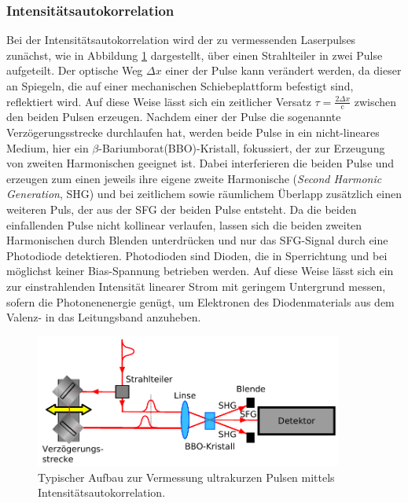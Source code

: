       \subsubsection{Intensitätsautokorrelation}  
      \label{sec:AK47}
        Bei der Intensitätsautokorrelation wird der zu vermessenden Laserpulses zunächst, wie in Abbildung \ref{fig:autokorrelator} dargestellt, über einen Strahlteiler in zwei Pulse aufgeteilt. 
        Der optische Weg $\Delta x$ einer der Pulse kann verändert werden, da dieser an Spiegeln, die auf einer mechanischen Schiebeplattform befestigt sind, reflektiert wird. Auf diese Weise lässt sich 
        ein zeitlicher Versatz $\tau=\frac{2\Delta x}{\text{c}}$ zwischen den beiden Pulsen erzeugen. Nachdem einer der Pulse die sogenannte Verzögerungsstrecke durchlaufen hat, werden beide Pulse in ein 
        nicht-lineares Medium, hier ein 
        $\beta$-Bariumborat(BBO)-Kristall, fokussiert, der zur Erzeugung von zweiten Harmonischen geeignet ist. Dabei interferieren die beiden Pulse und erzeugen zum einen jeweils ihre eigene zweite Harmonische 
        (\textit{Second Harmonic Generation}, SHG) und bei zeitlichem sowie räumlichem Überlapp zusätzlich einen weiteren Puls, der aus der SFG der beiden Pulse entsteht. Da die beiden einfallenden Pulse nicht 
        kollinear verlaufen, lassen sich die beiden zweiten Harmonischen durch Blenden unterdrücken und nur das SFG-Signal durch eine Photodiode detektieren. Photodioden sind Dioden, die in Sperrichtung und 
        bei möglichst keiner Bias-Spannung betrieben werden. Auf diese Weise lässt sich ein zur einstrahlenden Intensität linearer Strom mit geringem Untergrund messen, sofern die Photonenenergie genügt, um
        Elektronen des Diodenmaterials aus dem Valenz- in das Leitungsband anzuheben.  
        \FloatBarrier
        \begin{figure}[h]
          \centering
          \includegraphics[width = 0.9\textwidth]{pictures/autokorrelator.pdf}
          \caption{Typischer Aufbau zur Vermessung ultrakurzen Pulsen mittels Intensitätsautokorrelation.}
          \label{fig:autokorrelator}
        \end{figure}
